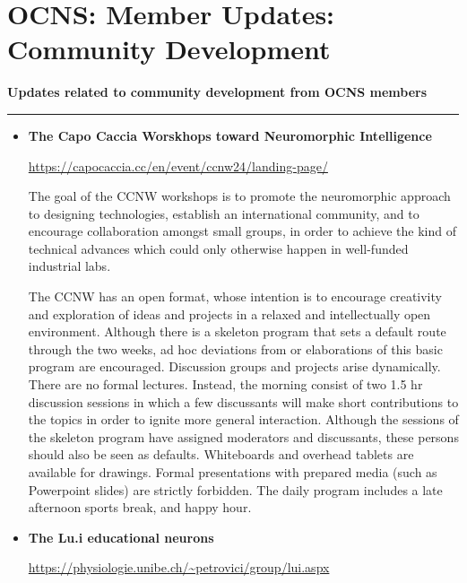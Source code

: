 \section*{OCNS: Member Updates: Community Development}%
\textbf{\large Updates related to community development from OCNS members\\}
\rule{\textwidth}{0.4pt}

\begin{itemize}
    \item \textbf{The Capo Caccia Worskhops toward Neuromorphic Intelligence}

        \url{https://capocaccia.cc/en/event/ccnw24/landing-page/}

        The goal of the CCNW workshops is to promote the neuromorphic approach to designing technologies, establish an international community, and to encourage collaboration amongst small groups, in order to achieve the kind of technical advances which could only otherwise happen in well-funded industrial labs.

        The CCNW has an open format, whose intention is to encourage creativity and exploration of ideas and projects in a relaxed and intellectually open environment. Although there is a skeleton program that sets a default route through the two weeks, ad hoc deviations from or elaborations of this basic program are encouraged. Discussion groups and projects arise dynamically. There are no formal lectures. Instead, the morning consist of two 1.5 hr discussion sessions in which a few discussants will make short contributions to the topics in order to ignite more general interaction. Although the sessions of the skeleton program have assigned moderators and discussants, these persons should also be seen as defaults. Whiteboards and overhead tablets are available for drawings. Formal presentations with prepared media (such as Powerpoint slides) are strictly forbidden. The daily program includes a late afternoon sports break, and happy hour.

    \item \textbf{The Lu.i educational neurons}

        \url{https://physiologie.unibe.ch/~petrovici/group/lui.aspx}


\end{itemize}
